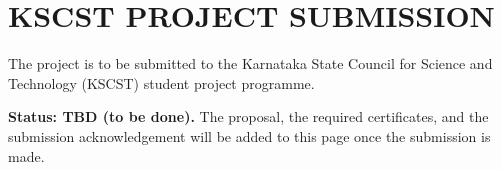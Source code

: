 \clearpage
{}
\label{submission:kscst}
\thispagestyle{report}
\section*{KSCST PROJECT SUBMISSION}
The project is to be submitted to the Karnataka State Council for Science and
Technology (KSCST) student project programme.

\textbf{Status: TBD (to be done).} The proposal, the required certificates, and
the submission acknowledgement will be added to this page once the submission is
made.

